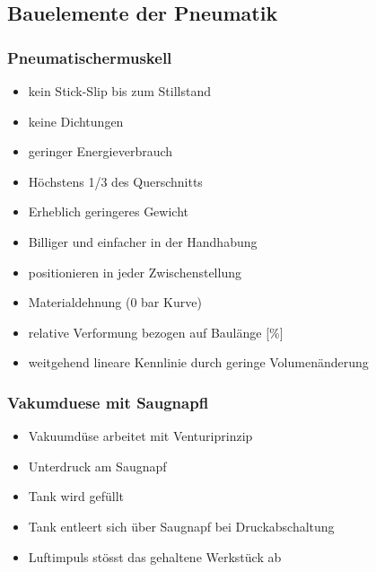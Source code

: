 \subsection{Bauelemente der Pneumatik}
\subsubsection{Pneumatischermuskell}
\begin{itemize}
\item kein Stick-Slip bis zum Stillstand
\item keine Dichtungen
\item geringer Energieverbrauch
\item Höchstens 1/3 des Querschnitts
\item Erheblich geringeres Gewicht
\item Billiger und einfacher in der Handhabung
\item positionieren in jeder Zwischenstellung
\end{itemize}

\begin{itemize}
\item Materialdehnung (0 bar Kurve)
\item relative Verformung bezogen auf Baulänge [\%]
\item weitgehend lineare Kennlinie durch geringe Volumenänderung
\end{itemize}

\subsubsection{Vakumduese mit Saugnapfl}
\begin{itemize}
\item Vakuumdüse arbeitet mit Venturiprinzip
\item Unterdruck am Saugnapf
\item Tank wird gefüllt
\item Tank entleert sich über Saugnapf bei Druckabschaltung
\item Luftimpuls stösst das gehaltene Werkstück ab
\end{itemize}
